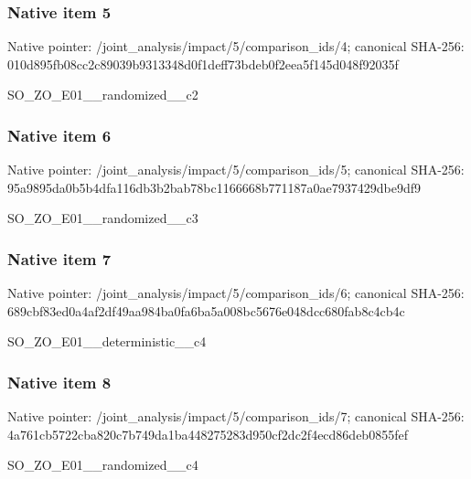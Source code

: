\documentclass[10pt,a4paper]{article}
\begin{document}
\subsubsection{Native item 5}
Native pointer: /joint\_\allowbreak{}analysis/impact/5/comparison\_\allowbreak{}ids/4; canonical SHA-256: 010d895fb08cc2c89039b9313348d0f1deff73bdeb0f2eea5f145d048f92035f

\begingroup\raggedright\sloppy SO\_\allowbreak{}ZO\_\allowbreak{}E01\_\allowbreak{}\_\allowbreak{}randomized\_\allowbreak{}\_\allowbreak{}c2\par\endgroup

\subsubsection{Native item 6}
Native pointer: /joint\_\allowbreak{}analysis/impact/5/comparison\_\allowbreak{}ids/5; canonical SHA-256: 95a9895da0b5b4dfa116db3b2bab78bc1166668b771187a0ae7937429dbe9df9

\begingroup\raggedright\sloppy SO\_\allowbreak{}ZO\_\allowbreak{}E01\_\allowbreak{}\_\allowbreak{}randomized\_\allowbreak{}\_\allowbreak{}c3\par\endgroup

\subsubsection{Native item 7}
Native pointer: /joint\_\allowbreak{}analysis/impact/5/comparison\_\allowbreak{}ids/6; canonical SHA-256: 689cbf83ed0a4af2df49aa984ba0fa6ba5a008bc5676e048dcc680fab8c4cb4c

\begingroup\raggedright\sloppy SO\_\allowbreak{}ZO\_\allowbreak{}E01\_\allowbreak{}\_\allowbreak{}deterministic\_\allowbreak{}\_\allowbreak{}c4\par\endgroup

\subsubsection{Native item 8}
Native pointer: /joint\_\allowbreak{}analysis/impact/5/comparison\_\allowbreak{}ids/7; canonical SHA-256: 4a761cb5722cba820c7b749da1ba448275283d950cf2dc2f4ecd86deb0855fef

\begingroup\raggedright\sloppy SO\_\allowbreak{}ZO\_\allowbreak{}E01\_\allowbreak{}\_\allowbreak{}randomized\_\allowbreak{}\_\allowbreak{}c4\par\endgroup
\end{document}
